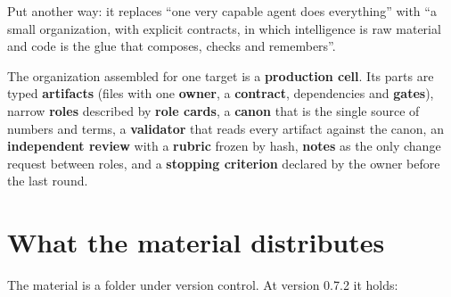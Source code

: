 \documentclass[
  american,
  10pt,
]{report}
\begin{document}
Put another way: it replaces ``one very capable agent does everything''
with ``a small organization, with explicit contracts, in which
intelligence is raw material and code is the glue that composes, checks
and remembers''.

The organization assembled for one target is a \textbf{production cell}.
Its parts are typed \textbf{artifacts} (files with one \textbf{owner}, a
\textbf{contract}, dependencies and \textbf{gates}), narrow
\textbf{roles} described by \textbf{role cards}, a \textbf{canon} that
is the single source of numbers and terms, a \textbf{validator} that
reads every artifact against the canon, an \textbf{independent review}
with a \textbf{rubric} frozen by hash, \textbf{notes} as the only change
request between roles, and a \textbf{stopping criterion} declared by the
owner before the last round.

\section{What the material
distributes}\label{what-the-material-distributes}

The material is a folder under version control. At version 0.7.2 it
holds:
\end{document}
